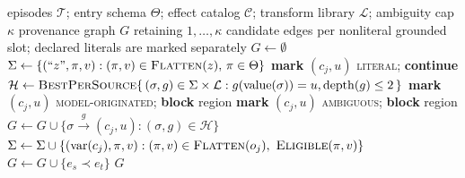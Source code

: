 \begin{algorithm}[t]
\caption{\textsc{BuildPatg} --- typed argument provenance. A slot with no witness is a
genuine model decision; a slot with too many witnesses is ambiguous. Both block the
region rather than defaulting to the cheapest explanation.}
\label{alg:patg}
\footnotesize
\begin{algorithmic}[1]
\Require episodes $\mathcal{T}$; entry schema $\Theta$; effect catalog $\mathcal{C}$;
         transform library $\mathcal{L}$; ambiguity cap $\kappa$
\Ensure provenance graph $G$ retaining $1,\ldots,\kappa$ candidate edges per
        nonliteral grounded slot; declared literals are marked separately
\State $G\gets\emptyset$
  \State $\Sigma\gets\{(\text{``}z\text{''},\pi,v) : (\pi,v)\in\textsc{Flatten}(z),\,
         \pi\in\Theta\}$ 
        \State \textbf{mark} $(c_j,u)$ \textsc{literal}; \textbf{continue}
      \EndIf
      \State $\mathcal{H}\gets\textsc{BestPerSource}\{\,(\sigma,g)\in
             \Sigma\times\mathcal{L}:g(\operatorname{value}(\sigma))=u,
             \operatorname{depth}(g)\le2\,\}$
        \State \textbf{mark} $(c_j,u)$ \textsc{model-originated}; \textbf{block} region
        \State \textbf{mark} $(c_j,u)$ \textsc{ambiguous}; \textbf{block} region
      \Else
        \State $G\gets G\cup\{\sigma\xrightarrow{\,g\,}(c_j,u):
               (\sigma,g)\in\mathcal{H}\}$
      \EndIf
    \EndFor
    \State $\Sigma\gets\Sigma\cup\{(\operatorname{var}(c_j),\pi,v) :
           (\pi,v)\in\textsc{Flatten}(o_j),\ \textsc{Eligible}(\pi,v)\}$
  \EndFor
    \State $G\gets G\cup\{e_s\prec e_t\}$
  \EndFor
\EndFor
\State \Return $G$
\end{algorithmic}
\end{algorithm}
